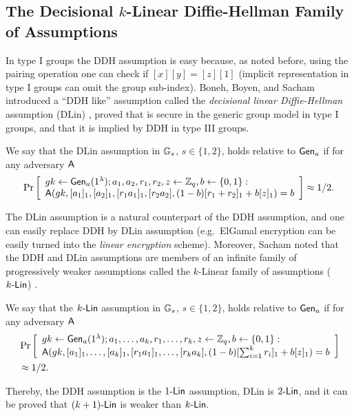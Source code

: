 \subsection{The Decisional $k$-Linear Diffie-Hellman Family of Assumptions}
In type I groups the DDH assumption is easy because, as noted before, using the pairing operation one can check if $[x][y]=[z][1]$ (implicit representation in type I groups can omit the group sub-index). Boneh, Boyen, and Sacham introduced a ``DDH like'' assumption called the \emph{decisional linear Diffie-Hellman} assumption (DLin) \cite{C:BonBoySha04}, proved that is secure in the generic group model in type I groups, and that it is implied by DDH in type III groups. 

\begin{definition}
We say that the DLin assumption in $\mathbb{G}_s$, $s\in\{1,2\}$, holds relative to $\mathsf{Gen}_a$ if for any adversary $\mathsf{A}$
$$
\Pr\left[\begin{array}{l}
gk\gets\mathsf{Gen}_a(1^\lambda);a_1,a_2,r_1,r_2,z\gets\mathbb{Z}_q,b\gets\{0,1\}:\\
\mathsf{A}(gk,[a_1]_1,[a_2]_1,[r_1a_1]_1,[r_2a_2],(1-b)[r_1+r_2]_1+b[z]_1)=b
\end{array}\right]\approx 1/2.
$$
\end{definition}

The DLin assumption is a natural counterpart of the DDH assumption, and one can easily replace DDH by DLin assumption (e.g.~ElGamal encryption can be easily turned into the \emph{linear encryption} scheme). Moreover, Sacham noted that  the DDH and DLin assumptions are members of an infinite family of progressively weaker assumptions called the $k$-Linear family of assumptions ($k\mbox{-}\mathsf{Lin}$) \cite{EPRINT:Shacham07a}.

\begin{definition}
We say that the $k\mbox{-}\mathsf{Lin}$ assumption in $\mathbb{G}_s$, $s\in\{1,2\}$, holds relative to $\mathsf{Gen}_a$ if for any adversary $\mathsf{A}$
\begin{align*}
&\Pr\left[\begin{array}{l}
gk\gets\mathsf{Gen}_a(1^\lambda);a_1,\ldots,a_k,r_1,\ldots,r_k,z\gets\mathbb{Z}_q,b\gets\{0,1\}:\\
\mathsf{A}(gk,[a_1]_1,\ldots,[a_k]_1,[r_1a_1]_1,\ldots,[r_ka_k],(1-b)[\sum_{i=1}^k r_i]_1+b[z]_1)=b
\end{array}\right]\\
&\approx 1/2.
\end{align*}
\end{definition}

Thereby, the DDH assumption is the $1\mbox{-}\mathsf{Lin}$ assumption, DLin is $2\mbox{-}\mathsf{Lin}$, and it can be proved that $(k+1)\mbox{-}\mathsf{Lin}$ is weaker than $k\mbox{-}\mathsf{Lin}$.
